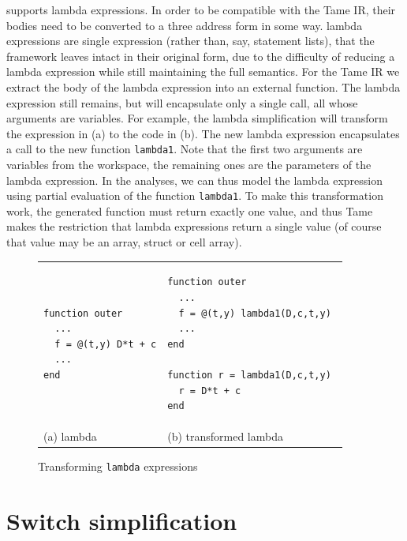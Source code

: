 \matlab supports lambda expressions. In order to be compatible with the Tame
IR, their bodies  need to be converted to a three address form in some way.
\matlab lambda expressions are single expression (rather than, say,
statement lists), that the \mcsaf framework leaves intact in their
 original form, due to the difficulty of reducing a lambda expression
 while still maintaining the full
\matlab semantics.
For the Tame IR we extract the body of the lambda expression into an
external function. The lambda expression still remains, but will encapsulate
only a single call, all whose arguments are variables.  For example, the lambda
simplification will transform the expression in (a) to the
code in (b).  The new lambda expression encapsulates a call
to the new function {\tt lambda1}. Note that the first two arguments are
variables from the workspace, the remaining ones are the parameters of the
lambda expression. In the analyses, we can thus model the lambda expression
using partial evaluation of the function {\tt lambda1}.   To make this
transformation work,  the generated function must return exactly one value, and
thus Tame \matlab makes the restriction that lambda expressions return a single
value (of course that value may be an array, struct or cell array).

\begin{figure}[htbp]
\begin{center}
\begin{tabular}{p{2.2in} p{3in}}
\begin{lstlisting}
function outer
  ...
  f = @(t,y) D*t + c
  ...
end
\end{lstlisting}
&
\begin{lstlisting}
function outer
  ...
  f = @(t,y) lambda1(D,c,t,y) 
  ...
end

function r = lambda1(D,c,t,y)
  r = D*t + c
end
\end{lstlisting}
\\
(a) lambda & (b) transformed lambda 
\end{tabular}

\caption{Transforming \texttt{lambda} expressions} \label{Fig:Lambda}
\end{center}
\end{figure}

\section{Switch simplification}

